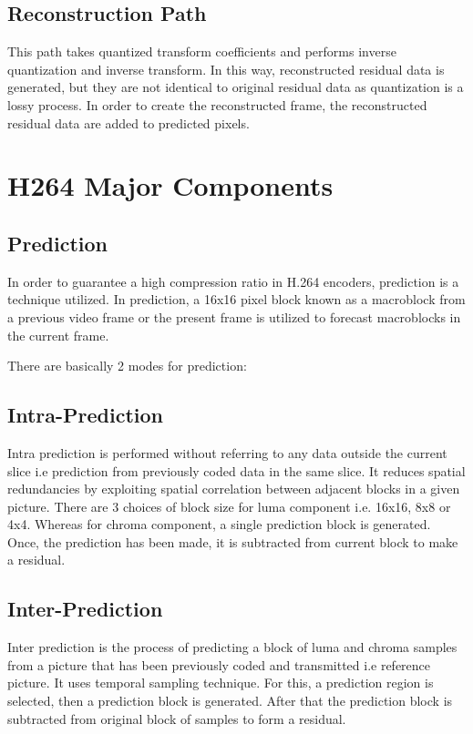 \subsection{Reconstruction Path}
This path takes quantized transform coefficients and performs inverse quantization and inverse transform. In this way, reconstructed residual data is generated, but they are not identical to original residual data as quantization is a lossy process. In order to create the reconstructed frame, the reconstructed residual data are added to predicted pixels. 

\section{H264 Major Components}

\subsection{Prediction}
In order to guarantee a high compression ratio in H.264 encoders, prediction is a technique utilized. In prediction, a 16x16 pixel block known as a macroblock from a previous video frame or the present frame is utilized to forecast macroblocks in the current frame. 

There are basically 2 modes for prediction:

\subsection{Intra-Prediction}
Intra prediction is performed without referring to any data outside the current slice i.e prediction from previously coded data in the same slice. It reduces spatial redundancies by exploiting spatial correlation between adjacent blocks in a given picture. There are 3 choices of block size for luma component i.e. 16x16, 8x8 or 4x4. Whereas for chroma component, a single prediction block is generated. Once, the prediction has been made, it is subtracted from current block to make a residual. 

\subsection{Inter-Prediction}
Inter prediction is the process of predicting a block of luma and chroma samples from a picture that has been previously coded and transmitted i.e reference picture. It uses temporal sampling technique. For this, a prediction region is selected, then a prediction block is generated. After that the prediction block is subtracted from original block of samples to form a residual. 

